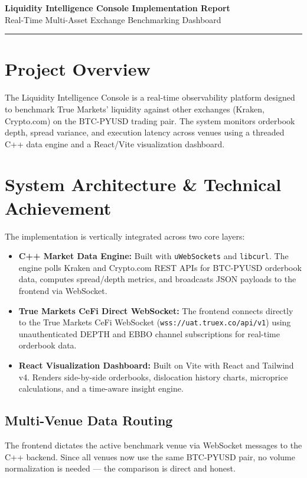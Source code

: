 \documentclass[10pt]{article}
\begin{document}
\begin{center}
    {\huge \bfseries \color{tmblue} Liquidity Intelligence Console Implementation Report}\\[10pt]
    {\large \color{tmgray} Real-Time Multi-Asset Exchange Benchmarking Dashboard}\\[5pt]
    \rule{\textwidth}{1pt}
\end{center}

\vspace{10pt}

\section{Project Overview}
The Liquidity Intelligence Console is a real-time observability platform designed to benchmark True Markets' liquidity against other exchanges (Kraken, Crypto.com) on the BTC-PYUSD trading pair. The system monitors orderbook depth, spread variance, and execution latency across venues using a threaded C++ data engine and a React/Vite visualization dashboard.

\section{System Architecture \& Technical Achievement}
The implementation is vertically integrated across two core layers:
\begin{itemize}[leftmargin=*]
    \item \textbf{C++ Market Data Engine:} Built with \texttt{uWebSockets} and \texttt{libcurl}. The engine polls Kraken and Crypto.com REST APIs for BTC-PYUSD orderbook data, computes spread/depth metrics, and broadcasts JSON payloads to the frontend via WebSocket.
    \item \textbf{True Markets CeFi Direct WebSocket:} The frontend connects directly to the True Markets CeFi WebSocket (\texttt{wss://uat.truex.co/api/v1}) using unauthenticated DEPTH and EBBO channel subscriptions for real-time orderbook data.
    \item \textbf{React Visualization Dashboard:} Built on Vite with React and Tailwind v4. Renders side-by-side orderbooks, dislocation history charts, microprice calculations, and a time-aware insight engine.
\end{itemize}

\subsection{Multi-Venue Data Routing}
The frontend dictates the active benchmark venue via WebSocket messages to the C++ backend. Since all venues now use the same BTC-PYUSD pair, no volume normalization is needed --- the comparison is direct and honest.
\end{document}
